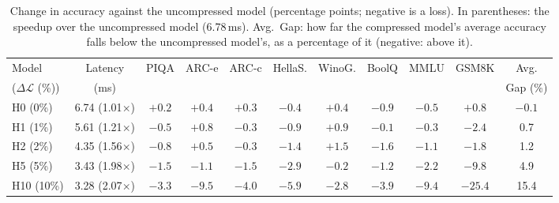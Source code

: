 \documentclass[11pt]{article}
\newcommand{\dloss}{\Delta\mathcal{L}}
\begin{document}
\begin{table}[!ht]
\centering
\small
\setlength{\tabcolsep}{3pt}
\begin{tabular}{lcccccccccc}
\toprule
Model & Latency & PIQA & ARC-e & ARC-c & HellaS. & WinoG. & BoolQ & MMLU & GSM8K & Avg. \\
($\dloss$ (\%)) & (ms)   &      &       &       &         &        &       &      &       & Gap (\%) \\
\midrule
H0  (0\%)  & 6.74 (1.01$\times$) & $+0.2$ & $+0.4$ & $+0.3$ & $-0.4$ & $+0.4$ & $-0.9$ & $-0.5$ & $+0.8$  & $-0.1$ \\
H1  (1\%)  & 5.61 (1.21$\times$) & $-0.5$ & $+0.8$ & $-0.3$ & $-0.9$ & $+0.9$ & $-0.1$ & $-0.3$ & $-2.4$  & 0.7 \\
H2  (2\%)  & 4.35 (1.56$\times$) & $-0.8$ & $+0.5$ & $-0.3$ & $-1.4$ & $+1.5$ & $-1.6$ & $-1.1$ & $-1.8$  & 1.2 \\
H5  (5\%)  & 3.43 (1.98$\times$) & $-1.5$ & $-1.1$ & $-1.5$ & $-2.9$ & $-0.2$ & $-1.2$ & $-2.2$ & $-9.8$  & 4.9 \\
H10 (10\%) & 3.28 (2.07$\times$) & $-3.3$ & $-9.5$ & $-4.0$ & $-5.9$ & $-2.8$ & $-3.9$ & $-9.4$ & $-25.4$ & 15.4 \\
\bottomrule
\end{tabular}
\caption{Change in accuracy against the uncompressed model (percentage points; negative is a loss). In parentheses: the speedup over the uncompressed model (6.78\,ms). Avg.\ Gap: how far the compressed model's average accuracy falls below the uncompressed model's, as a percentage of it (negative: above it).}
\label{tab:hwdelta}
\end{table}

\FloatBarrier
\end{document}
